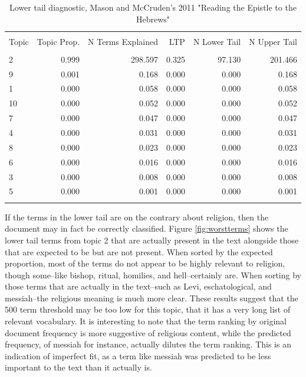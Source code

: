 \documentclass[]{book}
\theoremstyle{definition}
\theoremstyle{definition}
\theoremstyle{definition}
\theoremstyle{remark}
\begin{document}
\begin{table}[!htbp] \centering 
  \caption{Lower tail diagnostic, Mason and McCruden's 2011 "Reading the Epistle to the Hebrews"} 
  \label{tab:worstdoc} 
\begin{tabular}{@{\extracolsep{5pt}} lrrrrr} 
\\[-1.8ex]\hline 
\hline \\[-1.8ex] 
Topic & Topic Prop. & N Terms Explained & LTP & N Lower Tail & N Upper Tail \\ 
\hline \\[-1.8ex] 
2 & 0.999 & 298.597 & 0.325 & 97.130 & 201.466 \\ 
9 & 0.001 &   0.168 & 0.000 &  0.000 &   0.168 \\ 
1 & 0.000 &   0.058 & 0.000 &  0.000 &   0.058 \\ 
10 & 0.000 &   0.052 & 0.000 &  0.000 &   0.052 \\ 
7 & 0.000 &   0.047 & 0.000 &  0.000 &   0.047 \\ 
4 & 0.000 &   0.031 & 0.000 &  0.000 &   0.031 \\ 
8 & 0.000 &   0.023 & 0.000 &  0.000 &   0.023 \\ 
6 & 0.000 &   0.016 & 0.000 &  0.000 &   0.016 \\ 
3 & 0.000 &   0.008 & 0.000 &  0.000 &   0.008 \\ 
5 & 0.000 &   0.001 & 0.000 &  0.000 &   0.001 \\ 
\hline \\[-1.8ex] 
\end{tabular} 
\end{table}

If the terms in the lower tail are on the contrary about religion, then
the document may in fact be correctly classified. Figure
\ref{fig:worstterms} shows the lower tail terms from topic 2 that are
actually present in the text alongside those that are expected to be but
are not present. When sorted by the expected proportion, most of the
terms do not appear to be highly relevant to religion, though some--like
bishop, ritual, homilies, and hell--certainly are. When sorting by those
terms that are actually in the text--such as Levi, eschatological, and
messiah--the religious meaning is much more clear. These results suggest
that the 500 term threshold may be too low for this topic, that it has a
very long list of relevant vocabulary. It is interesting to note that
the term ranking by original document frequency is more suggestive of
religious content, while the predicted frequency, of messiah for
instance, actually dilutes the term ranking. This is an indication of
imperfect fit, as a term like messiah was predicted to be less important
to the text than it actually is.
\end{document}

